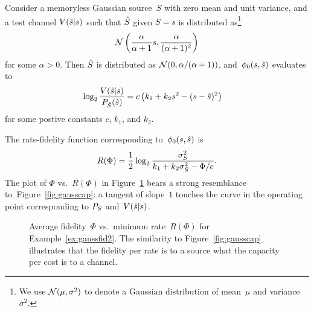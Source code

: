 \begin{example}[Gaussian]
  \label{ex:gaussfid2}
  Consider a memoryless Gaussian source~$S$ with zero mean and unit variance,
  and a test channel $V({\hat{s}}|s)$ such that ${\hat{S}}$ given $S=s$ is distributed
  as\footnote{We use ${\mathcal{N}}(\mu, \sigma^2)$ to denote a Gaussian distribution of
  mean~$\mu$ and variance~$\sigma^2$.}
  \[ {\mathcal{N}}\left( \frac{\alpha}{\alpha+1}s, \frac{ \alpha}{(\alpha+1)^2}
  \right) \]
  for some $\alpha > 0$. Then ${\hat{S}}$ is distributed as ${\mathcal{N}}(0, \alpha /
  (\alpha + 1))$, and~${\phi_0}(s,{\hat{s}})$ evaluates to
  \begin{align*}
    \log_2 \frac{V({\hat{s}}|s)}{{P_{\hat{S}}}({\hat{s}})} 
    &= c \left( k_1 + k_2 s^2 -(s-{\hat{s}})^2 \right)
  \end{align*}
  for some postive constants $c$, $k_1$, and $k_2$.
  
  The rate-fidelity function corresponding to~${\phi_0}(s,{\hat{s}})$ is
  \begin{equation*}
    R(\Phi) = \frac{1}{2} \log_2 \frac{{\sigma_S^2}}{k_1 + k_2 {\sigma_S^2} - \Phi/c}.
  \end{equation*}
  The plot of $\Phi$ vs.\ $R(\Phi)$ in Figure~\ref{fig:ratefidplot} bears a
  strong resemblance to~Figure~\ref{fig:gausscap}: a tangent of slope~$1$
  touches the curve in the operating point corresponding to ${P_S}$
  and~$V({\hat{s}}|s)$. 
  \begin{figure}
    \begin{center}
    \end{center}
    \caption{Average fidelity~$\Phi$ vs.\ minimum rate~$R(\Phi)$ for
    Example~\ref{ex:gaussfid2}. The similarity to Figure~\ref{fig:gausscap}
    illustrates that the fidelity per rate is to a source what the capacity per
    cost is to a channel.}
    \label{fig:ratefidplot}
  \end{figure}
\end{example}

